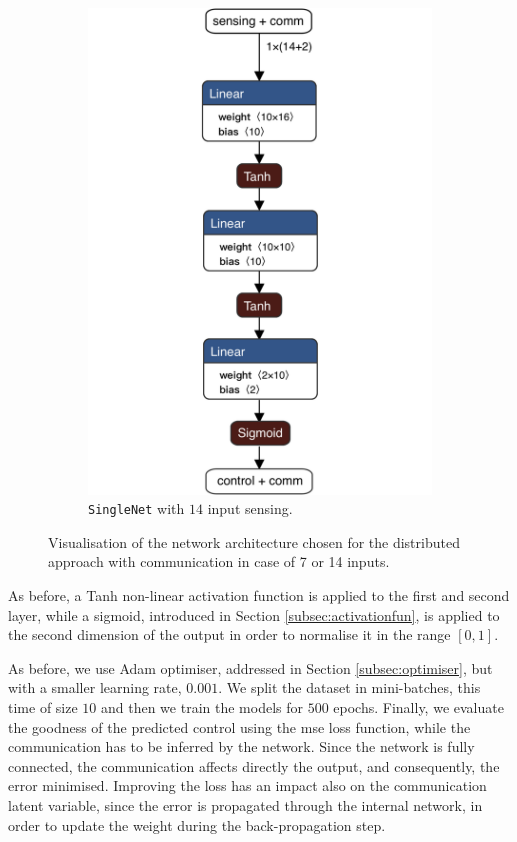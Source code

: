 \begin{figure}[!htb]
\begin{subfigure}[h]{0.495\textwidth}
		\includegraphics[width=.8\textwidth]{contents/images/task1distributed_allcomm@4x}
		\caption{\texttt{SingleNet} with $14$ input sensing.}
	\end{subfigure}
	\caption[Network architectures for the distributed approach with 
	communication.]{Visualisation of the network architecture chosen for the 
		distributed approach with communication in case of 7 or 14 inputs.}
	\label{fig:singlenetcomm1}
\end{figure}

As before, a Tanh non-linear activation function is applied to the first and second 
layer, while a sigmoid, introduced in Section \ref{subsec:activationfun}, is applied 
to the second dimension of the output in order to normalise it in the range $[0, 
1]$.

As before, we use Adam optimiser, addressed in Section \ref{subsec:optimiser}, 
but with a smaller learning rate, $0.001$. 
We split the dataset in mini-batches, this time of size $10$ and then we train 
the models for $500$ epochs. 
Finally, we evaluate the goodness of the predicted control using the \gls{mse} 
loss function, while the communication has to be inferred by the network.
Since the network is fully connected, the communication affects directly the 
output, and consequently, the error minimised. Improving the loss has an impact 
also on the communication latent variable, since the error is propagated through 
the internal network, in order to update the weight during the back-propagation 
step.

